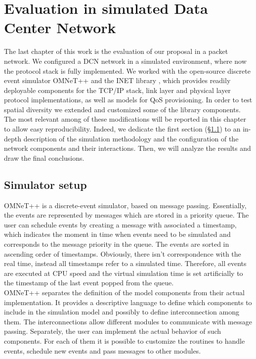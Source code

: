 \chapter{Evaluation in simulated Data Center Network}
\label{ch:dcn-simulations}
The last chapter of this work is the evaluation of our proposal in a packet network. We configured a DCN network in a simulated environment, where now the protocol stack is fully implemented. We worked with the open-source discrete event simulator OMNeT++ \cite{omnetpp} and the INET library \cite{inet}, which provides readily deployable components for the TCP/IP stack, link layer and physical layer protocol implementations, as well as models for QoS provisioning. In order to test spatial diversity we extended and customized some of the library components. The most relevant among of these modifications will be reported in this chapter to allow easy reproducibility. Indeed, we dedicate the first section (\S \ref{sec:opp-setup}) to an in-depth description of the simulation methodology and the configuration of the network components and their interactions. Then, we will analyze the results and draw the final conclusions. 
\section{Simulator setup}
\label{sec:opp-setup}
OMNeT++ is a discrete-event simulator, based on message passing. Essentially, the events are represented by messages which are stored in a priority queue. The user can schedule events by creating a message with associated a timestamp, which indicates the moment in time when events need to be simulated and corresponds to the message priority in the queue.  The events are sorted in ascending order of timestamps.  Obviously, there isn't correspondence with the real time, instead all timestamps refer to a simulated time. Therefore, all events are executed at CPU speed and the virtual simulation time is set artificially to the timestamp of the last event popped from the queue. \\ OMNeT++ separates the definition of the model components from their actual implementation. It provides a descriptive language to define which components to include in the simulation model and possibly to define interconnection among them. The interconnections allow different modules to communicate with message passing. Separately, the user can implement the actual behavior of such components. For each of them it is possible to customize the routines to handle events, schedule new events and pass messages to other modules.

